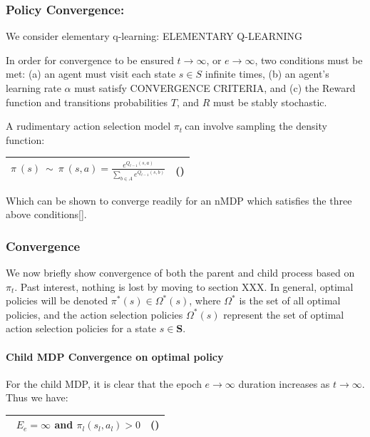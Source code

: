 \documentclass[]{article}
\let\oldparagraph\paragraph
\renewcommand{\paragraph}[1]{\oldparagraph{#1}\mbox{}}
\begin{document}
\subsubsection{Policy Convergence:}\label{policy-convergence}

We consider elementary q-learning: ELEMENTARY Q-LEARNING

In order for convergence to be ensured \(t \rightarrow \infty\), or
\(e \rightarrow \infty\), two conditions must be met: (a) an agent must
visit each state \(s \in S\) infinite times, (b) an agent's learning
rate \(\alpha\) must satisfy CONVERGENCE CRITERIA, and (c) the Reward
function and transitions probabilities \(T\), and \(R\) must be stably
stochastic.

A rudimentary action selection model \(\pi_{t}\ \)can involve sampling
the density function:

\begin{longtable}[]{@{}ll@{}}
\toprule
\(\pi_{\ }\left( s \right)\ \sim\ \pi_{\ }\left( s,a \right) = \frac{e^{Q_{t - 1}(s,a)}}{\sum_{b \in A}^{\ }e^{Q_{t - 1}(s,b)}}\)
& ()\tabularnewline
\bottomrule
\end{longtable}

Which can be shown to converge readily for an nMDP which satisfies the
three above conditions{[}{]}.

\subsubsection{Convergence}\label{convergence}

We now briefly show convergence of both the parent and child process
based on \(\pi_{t}\). Past interest, nothing is lost by moving to
section XXX. In general, optimal policies will be denoted
\(\pi^{*}(s) \in \Omega^{*}(s)\), where \(\Omega^{*}\) is the set of all
optimal policies, and the action selection policies \(\Omega^{*}(s)\)
represent the set of optimal action selection policies for a state
\(s \in \mathbf{S}\).

\paragraph{Child MDP Convergence on optimal
policy}\label{child-mdp-convergence-on-optimal-policy}

For the child MDP, it is clear that the epoch \(e \rightarrow \infty\)
duration increases as \(t \rightarrow \infty\). Thus we have:

\begin{longtable}[]{@{}ll@{}}
\toprule
\(\operatorname{}\overset{}{E_{e}} = \infty\) and
\(\pi_{l}\left( s_{l},a_{l} \right) > 0\) & ()\tabularnewline
\bottomrule
\end{longtable}
\end{document}
